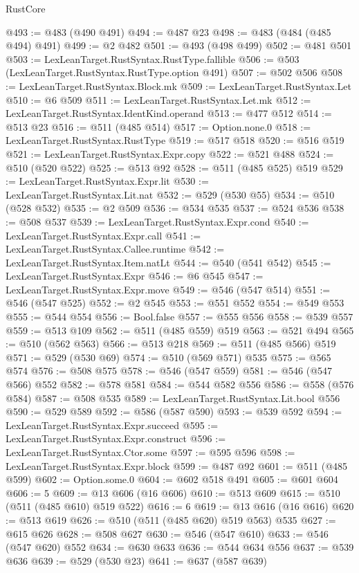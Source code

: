 \begin{lexlean}{RustCore}
\begin{coremodule}
@493 := @483 (@490 @491)
@494 := @487 @23
@498 := @483 (@484 (@485 @494) @491)
@499 := @2 @482
@501 := @493 (@498 @499)
@502 := @481 @501
@503 := LexLeanTarget.RustSyntax.RustType.fallible
@506 := @503 (LexLeanTarget.RustSyntax.RustType.option @491)
@507 := @502 @506
@508 := LexLeanTarget.RustSyntax.Block.mk
@509 := LexLeanTarget.RustSyntax.Let
@510 := @6 @509
@511 := LexLeanTarget.RustSyntax.Let.mk
@512 := LexLeanTarget.RustSyntax.IdentKind.operand
@513 := @477 @512
@514 := @513 @23
@516 := @511 (@485 @514)
@517 := Option.none.{0}
@518 := LexLeanTarget.RustSyntax.RustType
@519 := @517 @518
@520 := @516 @519
@521 := LexLeanTarget.RustSyntax.Expr.copy
@522 := @521 @488
@524 := @510 (@520 @522)
@525 := @513 @92
@528 := @511 (@485 @525) @519
@529 := LexLeanTarget.RustSyntax.Expr.lit
@530 := LexLeanTarget.RustSyntax.Lit.nat
@532 := @529 (@530 @55)
@534 := @510 (@528 @532)
@535 := @2 @509
@536 := @534 @535
@537 := @524 @536
@538 := @508 @537
@539 := LexLeanTarget.RustSyntax.Expr.cond
@540 := LexLeanTarget.RustSyntax.Expr.call
@541 := LexLeanTarget.RustSyntax.Callee.runtime
@542 := LexLeanTarget.RustSyntax.Item.natLt
@544 := @540 (@541 @542)
@545 := LexLeanTarget.RustSyntax.Expr
@546 := @6 @545
@547 := LexLeanTarget.RustSyntax.Expr.move
@549 := @546 (@547 @514)
@551 := @546 (@547 @525)
@552 := @2 @545
@553 := @551 @552
@554 := @549 @553
@555 := @544 @554
@556 := Bool.false
@557 := @555 @556
@558 := @539 @557
@559 := @513 @109
@562 := @511 (@485 @559) @519
@563 := @521 @494
@565 := @510 (@562 @563)
@566 := @513 @218
@569 := @511 (@485 @566) @519
@571 := @529 (@530 @69)
@574 := @510 (@569 @571) @535
@575 := @565 @574
@576 := @508 @575
@578 := @546 (@547 @559)
@581 := @546 (@547 @566) @552
@582 := @578 @581
@584 := @544 @582 @556
@586 := @558 (@576 @584)
@587 := @508 @535
@589 := LexLeanTarget.RustSyntax.Lit.bool @556
@590 := @529 @589
@592 := @586 (@587 @590)
@593 := @539 @592
@594 := LexLeanTarget.RustSyntax.Expr.succeed
@595 := LexLeanTarget.RustSyntax.Expr.construct
@596 := LexLeanTarget.RustSyntax.Ctor.some
@597 := @595 @596
@598 := LexLeanTarget.RustSyntax.Expr.block
@599 := @487 @92
@601 := @511 (@485 @599)
@602 := Option.some.{0}
@604 := @602 @518 @491
@605 := @601 @604
@606 := 5
@609 := @13 @606 (@16 @606)
@610 := @513 @609
@615 := @510 (@511 (@485 @610) @519 @522)
@616 := 6
@619 := @13 @616 (@16 @616)
@620 := @513 @619
@626 := @510 (@511 (@485 @620) @519 @563) @535
@627 := @615 @626
@628 := @508 @627
@630 := @546 (@547 @610)
@633 := @546 (@547 @620) @552
@634 := @630 @633
@636 := @544 @634 @556
@637 := @539 @636
@639 := @529 (@530 @23)
@641 := @637 (@587 @639)

\end{coremodule}
\end{lexlean}
